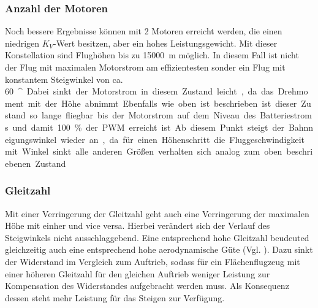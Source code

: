 \subsubsection{Anzahl der Motoren}
Noch bessere Ergebnisse können mit 2 Motoren erreicht werden, die  einen niedrigen \ensuremath{K_V}-Wert besitzen, aber ein hohes Leistungsgewicht. Mit dieser Konstellation sind Flughöhen bis zu \SI{15000}{m} möglich. In diesem Fall ist nicht der Flug mit maximalen Motorstrom am effizientesten sonder ein Flug mit konstantem Steigwinkel von ca. \SI{60}{^\circ}. Dabei sinkt der Motorstrom in diesem Zustand leicht, da das Drehmoment mit der Höhe abnimmt. Ebenfalls wie oben ist beschrieben ist dieser Zustand so lange fliegbar bis der Motorstrom auf dem Niveau des Batteriestroms und damit \SI{100}{\%} der PWM erreicht ist. Ab diesem Punkt steigt der Bahnneigungswinkel wieder an, da für einen Höhenschritt die Fluggeschwindigkeit mit Winkel sinkt. alle anderen Größen verhalten sich analog zum oben beschriebenen Zustand


\subsubsection{Gleitzahl}
Mit einer Verringerung der Gleitzahl geht auch eine Verringerung der maximalen Höhe mit einher und vice versa. Hierbei verändert sich der Verlauf des Steigwinkels nicht ausschlaggebend. Eine entsprechend hohe Gleitzahl beudeuted gleichzeitig auch eine entsprechend hohe aerodynamische Güte (Vgl. \cite{Scheiderer.2008}). Dazu sinkt der Widerstand im Vergleich zum Auftrieb, sodass für ein Flächenflugzeug mit einer höheren Gleitzahl für den gleichen Auftrieb weniger Leistung zur Kompensation des Widerstandes aufgebracht werden muss. Als Konsequenz dessen steht mehr Leistung für das Steigen zur Verfügung.


